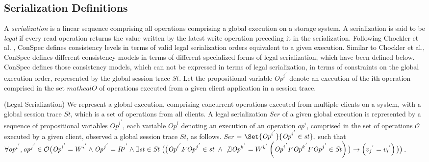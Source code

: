 \documentclass{sig-alternate-05-2015}
\begin{document}
\subsection{Serialization Definitions}
 A \emph{serialization} is a linear sequence comprising all operations comprising a global  execution on a
   storage system.
A serialization is said to be \emph{legal} if every read operation returns the value written by the latest write
    operation preceding it in the serialization.  Following Chockler et al. \cite{Chockler2000}, ConSpec defines
  consistency levels in terms of valid legal serialization orders equivalent to a given execution. Similar to Chockler et al., ConSpec defines different consistency models in terms of different specialized forms of legal serialization, which have been defined below. ConSpec defines those consistency models, which can not be expressed in terms of legal serialization, in terms of constraints on the global execution order,  represented by the global session trace $\mathit{St}$.
    Let the propositional variable ${\mathit{Op}^i}^{'}$ denote an execution of the
    i\textquotesingle th operation comprised in the set $mathcal{O}$ of operations executed from a given client application in a session trace.
    \begin{definition}(Legal Serialization)
    We represent a global execution, comprising concurrent operations executed from multiple clients on a system, with a global session trace $\mathit{St}$, which is a set of operations from all clients. A legal serialization $\mathit{Ser}$ of a given global execution is represented by a sequence of propositional variables ${\mathit{Op}^i}^{'}$, each variable ${\mathit{Op}^i}$ denoting an execution of an
  operation ${\mathit{op}}^i$, comprised in the set of operations $\mathcal{O}$ executed by a given client, observed a global session trace $\mathit{St}$, as follows.
    $\mathit{Ser}$ = $\Set{ {\mathit{Op}^i}^{'} } {{\mathit{Op}^i}^{'} \in \mathit{st}}, $ such that
    $\forall {\mathit{op}^i}^{'}, {\mathit{op}^j}^{'} \in \mathcal{O} \\ \big( {\mathit{Op}^i}^{'} = {W^i}^{'} \wedge {\mathit{Op}^j}^{'} = {R^j}^{'}  \wedge \exists \mathit{st} \in \mathit{St}  \; \big( \big( {\mathit{Op}^i}^{'} F {\mathit{Op}^j}^{'} \in \mathit{st}  \; \wedge \\
   \not\exists {\mathit{Op}^k}^{'} = {W^k}^{'} \left( {\mathit{Op}^i}^{'}  F {\mathit{Op}^k}^{'} F {\mathit{Op}^j}^{'} \in \mathit{St}  \right) \big)
   \rightarrow \left( {v_j}^{'} = {v_i}^{'} \right) \big) \big)$.
    \end{definition}\label{def:ser}
\end{document}
